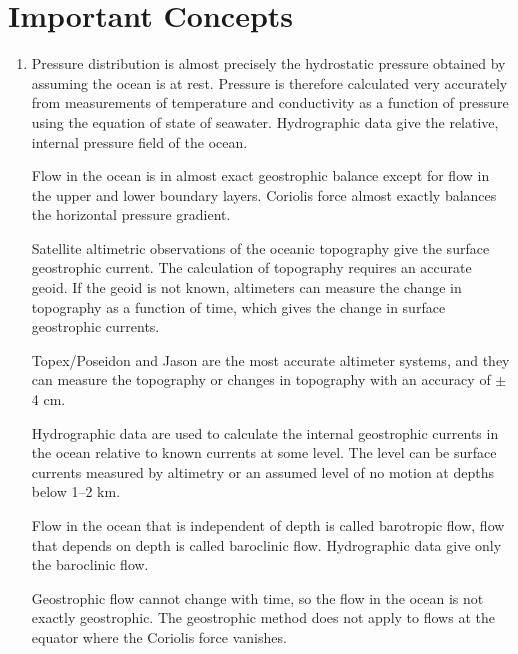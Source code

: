 \section{Important Concepts}
\begin{enumerate}

\item Pressure distribution is almost precisely the hydrostatic pressure
obtained by assuming the ocean is at rest. Pressure is therefore
calculated very accurately from measurements of temperature and
conductivity as a function of pressure using the equation of state of
seawater. Hydrographic data
give the relative, internal pressure field of the ocean.

\vitem Flow in the ocean is in almost exact geostrophic
balance except for flow in the upper and
lower boundary layers. Coriolis force almost exactly balances the
horizontal pressure gradient.

\vitem Satellite altimetric observations of the oceanic topography
give the surface geostrophic current. The calculation of topography
requires an accurate geoid. If the geoid is
not known, altimeters can measure the change in topography as a
function of time, which gives the change in surface geostrophic
currents.

\vitem Topex/Poseidon and Jason are
the most accurate altimeter systems, and they can measure the
topography or changes in
topography with an accuracy of $\pm$4 cm.

\vitem Hydrographic data are used to calculate the internal geostrophic
currents in
the ocean relative to known currents at some level. The level can be
surface currents measured by altimetry or an assumed level of no
motion at depths below 1--2 km.

\vitem Flow in the ocean that is independent of depth is called
barotropic flow, flow that depends on depth is called baroclinic
flow. Hydrographic data give only the baroclinic flow.

\vitem Geostrophic flow cannot change with time, so the flow in the
ocean is not exactly geostrophic. The geostrophic method does not
apply to flows at the equator where the Coriolis force vanishes.


\end{enumerate}
